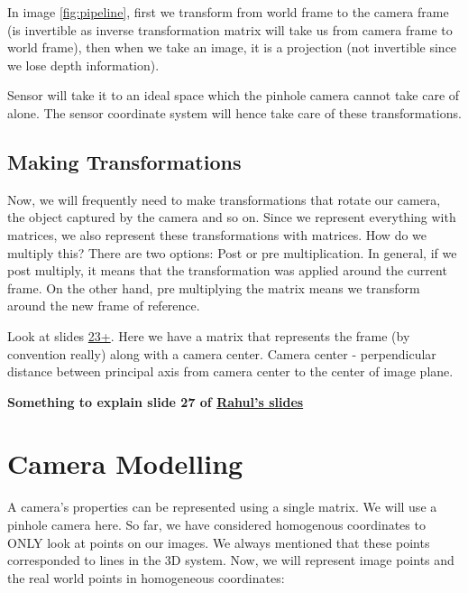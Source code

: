 In image \ref{fig:pipeline}, first we transform from world frame to the camera frame (is invertible as inverse transformation matrix will take us from camera frame to world frame), then when we take an image, it is a projection (not invertible since we lose depth information).

Sensor will take it to an ideal space which the pinhole camera cannot take care of alone. The sensor coordinate system will hence take care of these transformations. 

\subsection{Making Transformations}

Now, we will frequently need to make transformations that rotate our camera, the object captured by the camera and so on. Since we represent everything with matrices, we also represent these transformations with matrices. How do we multiply this? There are two options: Post or pre multiplication. In general, if we post multiply, it means that the transformation was applied around the current frame. On the other hand, pre multiplying the matrix means we transform around the new frame of reference.

Look at slides \href{https://github.com/RoboticsIIITH/summer-sessions-2020/blob/master/lecture-slides/Multiple\%20View\%20Geometry/lecture-1/MVG_Session_1.pdf}{23+}. Here we have a matrix that represents the frame (by convention really) along with a camera center. Camera center - perpendicular distance between principal axis from camera center to the center of image plane.

\textbf{Something to explain slide 27 of \href{https://github.com/RoboticsIIITH/summer-sessions-2020/blob/master/lecture-slides/Multiple\%20View\%20Geometry/lecture-1/MVG_Session_1.pdf}{Rahul's slides}}

\section{Camera Modelling}

A camera's properties can be represented using a single matrix. We will use a pinhole camera here. So far, we have considered homogenous coordinates to ONLY look at points on our images. We always mentioned that these points corresponded to lines in the 3D system. Now, we will represent image points and the real world points in homogeneous coordinates:

